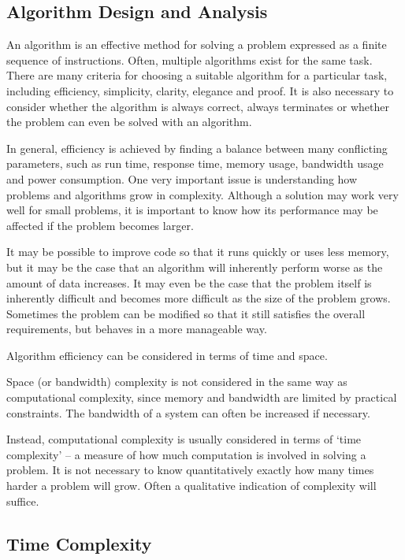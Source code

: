 \subsection{Algorithm Design and Analysis}

An algorithm is an effective method for solving a problem expressed as a finite sequence of instructions.
Often, multiple algorithms exist for the same task.
There are many criteria for choosing a suitable algorithm for a particular task, including efficiency, simplicity, clarity, elegance and proof.
It is also necessary to consider whether the algorithm is always correct, always terminates or whether the problem can even be solved with an algorithm.

In general, efficiency is achieved by finding a balance between many conflicting parameters, such as run time, response time, memory usage, bandwidth usage and power consumption.
One very important issue is understanding how problems and algorithms grow in complexity.
Although a solution may work very well for small problems, it is important to know how its performance may be affected if the problem becomes larger.

It may be possible to improve code so that it runs quickly or uses less memory, but it may be the case that an algorithm will inherently perform worse as the amount of data increases.
It may even be the case that the problem itself is inherently difficult and becomes more difficult as the size of the problem grows.
Sometimes the problem can be modified so that it still satisfies the overall requirements, but behaves in a more manageable way.

Algorithm efficiency can be considered in terms of time and space.

Space (or bandwidth) complexity is not considered in the same way as computational complexity, since memory and bandwidth are limited by practical constraints.
The bandwidth of a system can often be increased if necessary.

Instead, computational complexity is usually considered in terms of `time complexity' -- a measure of how much computation is involved in solving a problem.
It is not necessary to know quantitatively exactly how many times harder a problem will grow.
Often a qualitative indication of complexity will suffice.

\subsection{Time Complexity}

